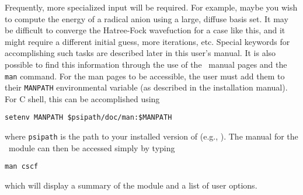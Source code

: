 Frequently, more specialized input will be required.  For example,
maybe you wish to compute the energy of a radical anion using a large,
diffuse basis set.  It may be difficult to converge the Hatree-Fock 
wavefuction for a case like this, and it might require a different
initial guess, more iterations, etc.  Special keywords for accomplishing
such tasks are described later in this user's manual.  It is also
possible to find this information through the use of the \PSIthree\
manual pages and the {\tt man} command.  For the man pages to be accessible,
the user must add them to their {\tt MANPATH} environmental variable (as
described in the installation manual).  For C shell, this can be 
accomplished using
\begin{verbatim}
setenv MANPATH $psipath/doc/man:$MANPATH
\end{verbatim}
where {\tt psipath} is the path to your installed version of 
\PSIthree (e.g., ).  The manual for the \PSIcscf\
module can then be accessed simply by typing
\begin{verbatim}
man cscf
\end{verbatim}
which will display a summary of the module and a list of user options.

